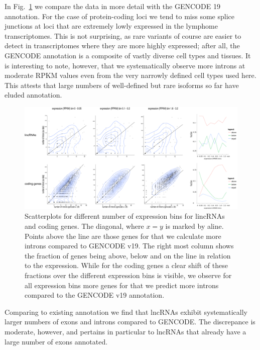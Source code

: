 \documentclass[ncrna,article,submit,moreauthors,pdftex,10pt,a4paper]{mdpi}
\begin{document}
In Fig.~\ref{fig:compare} we compare the  data in more detail with the
GENCODE 19 annotation. For the case of protein-coding loci we tend to miss
some splice junctions at loci that are extremely lowly expressed in the
lymphome transcriptomes. This is not surprising, as rare variants of course
are easier to detect in transcriptomes where they are more highly
expressed; after all, the GENCODE annotation is a composite of vastly
diverse cell types and tissues. It is interesting to note, however, that we
systematically observe more introns at moderate RPKM values even from the
very narrowly defined cell types used here. This attests that large numbers
of well-defined but rare isoforms so far have eluded annotation. 

\begin{figure}[ht]
  \begin{center}
    \includegraphics[width=\textwidth]{Fig1}
  \end{center}
  \caption{Scatterplots for different number of expression bins for
    lincRNAs and coding genes.  The diagonal, where $x=y$ is marked by
    aline. Points above the line are those genes for that we calculate more
    introns compared to GENCODE v19.  The right most column shows the
    fraction of genes being above, below and on the line in relation to the
    expression.  While for the coding genes a clear shift of these
    fractions over the different expression bins is visible, we observe for
    all expression bins more genes for that we predict more introns
    compared to the GENCODE v19 annotation.}
  \label{fig:compare}
\end{figure}

Comparing to existing annotation we find that lncRNAs exhibit
systematically larger numbers of exons and introns compared to GENCODE. The
discrepance is moderate, however, and pertains in particular to lncRNAs
that already have a large number of exons annotated. 
\end{document}
